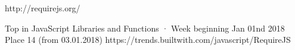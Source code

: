 http://requirejs.org/

Top in JavaScript Libraries and Functions · Week beginning Jan 01nd 2018
Place 14 (from 03.01.2018)
https://trends.builtwith.com/javascript/RequireJS